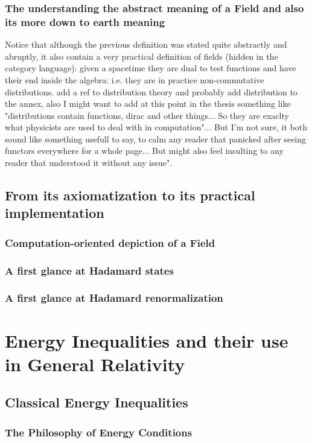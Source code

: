 \documentclass[a4paper,11pt]{article}
\numberwithin{equation}{section}
\theoremstyle{definition}
\begin{document}
\subsubsection{The understanding the abstract meaning of a Field and also its more down to earth meaning}
        Notice that although the previous definition was stated quite abstractly and abruptly, it also contain a very practical definition of fields (hidden in the category language): given a spacetime they are dual to test functions and have their end inside the algebra: i.e. they are in practice non-commutative distributions. \color{red} add a ref to distribution theory and probably add distribution to the annex, also I might want to add at this point in the thesis something like "distributions contain functions, dirac and other things... So they are exaclty what physicists are used to deal with in computation"... But I'm not sure, it both sound like something usefull to say, to calm any reader that panicked after seeing functors everywhere for a whole page... But might also feel insulting to any reader that understood it without any issue"\color{black}.
\subsection{From its axiomatization to its practical implementation}
\subsubsection{Computation-oriented depiction of a Field}
\subsubsection{A first glance at Hadamard states}
\subsubsection{A first glance at Hadamard renormalization}
\section{Energy Inequalities and their use in General Relativity}
\subsection{Classical Energy Inequalities}
\subsubsection{The Philosophy of Energy Conditions}
\end{document}
